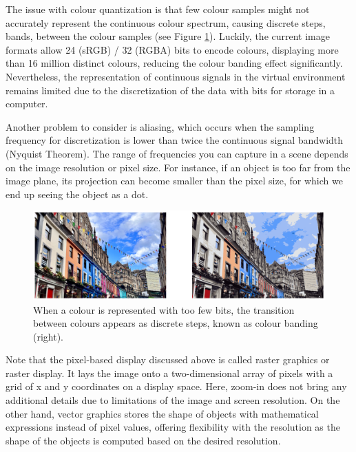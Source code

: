 

The issue with colour quantization is that few colour samples might not accurately represent the continuous colour spectrum, causing discrete steps, bands, between the colour samples (see Figure \ref{fig:colour-band}). Luckily, the current image formats allow 24 (sRGB) / 32 (RGBA) bits to encode colours, displaying more than 16 million distinct colours, reducing the colour banding effect significantly. Nevertheless, the representation of continuous signals in the virtual environment remains limited due to the discretization of the data with bits for storage in a computer.

Another problem to consider is aliasing, which occurs when the sampling frequency for discretization is lower than twice the continuous signal bandwidth (Nyquist Theorem). The range of frequencies you can capture in a scene depends on the image resolution or pixel size. For instance, if an object is too far from the image plane, its projection can become smaller than the pixel size, for which we end up seeing the object as a dot.



\begin{figure}
  \centering
    \includegraphics[width=0.9\linewidth]{Images/colour_quantization.png}

    \caption{When a colour is represented with too few bits, the transition between colours appears as discrete steps, known as colour banding (right).}\label{fig:colour-band}
\end{figure} 


Note that the pixel-based display discussed above is called raster graphics or raster display. It lays the image onto a two-dimensional array of pixels with a grid of x and y coordinates on a display space. Here, zoom-in does not bring any additional details due to limitations of the image and screen resolution. On the other hand, vector graphics stores the shape of objects with mathematical expressions instead of pixel values, offering flexibility with the resolution as the shape of the objects is computed based on the desired resolution.

